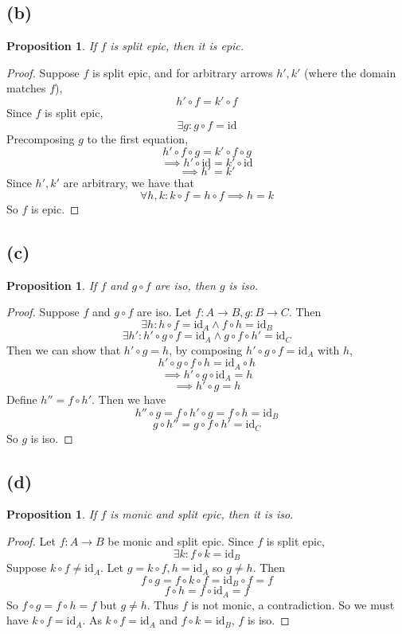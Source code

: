 \documentclass[11pt]{article} %
\newtheorem{proposition}[theorem]{Proposition}
\theoremstyle{definition}
\begin{document}
\subsection*{(b)}
\begin{proposition}
    If $f$ is split epic, then it is epic.
\end{proposition}
\begin{proof}
    Suppose $f$ is split epic, and for arbitrary arrows $h',k'$ (where the domain matches $f$),
    \[h'\circ f = k'\circ f\]
    Since $f$ is split epic,
    \[\exists g: g\circ f=\text{id}\]
    Precomposing $g$ to the first equation,
    \[h'\circ f\circ g = k'\circ f\circ g\]
    \[\implies h'\circ \text{id} = k'\circ \text{id}\]
    \[\implies h' = k'\]
    Since $h',k'$ are arbitrary, we have that
    \[\forall h,k: k\circ f = h\circ f \implies h = k\]
    So $f$ is epic.
\end{proof}
\subsection*{(c)}
\begin{proposition}
    If $f$ and $g\circ f$ are iso, then $g$ is iso.
\end{proposition}
\begin{proof}
    Suppose $f$ and $g\circ f$ are iso. Let $f:A\rightarrow B,g:B\rightarrow C$.
    Then
    \[\exists h: h\circ f = \text{id}_A \wedge f\circ h = \text{id}_B\]
    \[\exists h': h'\circ g\circ f = \text{id}_A \wedge g\circ f\circ h' = \text{id}_C\]
    Then we can show that $h'\circ g = h$, by composing $h'\circ g\circ f = \text{id}_A$ with $h$,
    \[h'\circ g\circ f \circ h = \text{id}_A \circ h\]
    \[\implies h'\circ g\circ \text{id}_A = h\]
    \[\implies h'\circ g= h\]
    Define $h''=f\circ h'$. Then we have
    \[h'' \circ g = f\circ h' \circ g = f\circ h = \text{id}_B\]
    \[g \circ h'' = g\circ f\circ h' = \text{id}_C\]
    So $g$ is iso.
\end{proof}
\subsection*{(d)}
\begin{proposition}
    If $f$ is monic and split epic, then it is iso.
\end{proposition}
\begin{proof}
    Let $f:A\rightarrow B$ be monic and split epic. Since $f$ is split epic,
    \[\exists k: f\circ k = \text{id}_B\]
    Suppose $k\circ f\neq \text{id}_A$.
    Let $g=k\circ f,h=\text{id}_A$ so $g\neq h$. Then
    \[f\circ g = f\circ k\circ f = \text{id}_B \circ f = f\]
    \[f\circ h = f\circ \text{id}_A = f\]
    So $f\circ g = f\circ h = f$ but $g \neq h$.
    Thus $f$ is not monic, a contradiction.
    So we must have $k\circ f= \text{id}_A$.
    As $k\circ f= \text{id}_A$ and $f\circ k = \text{id}_B$, $f$ is iso.
\end{proof}
\end{document}
